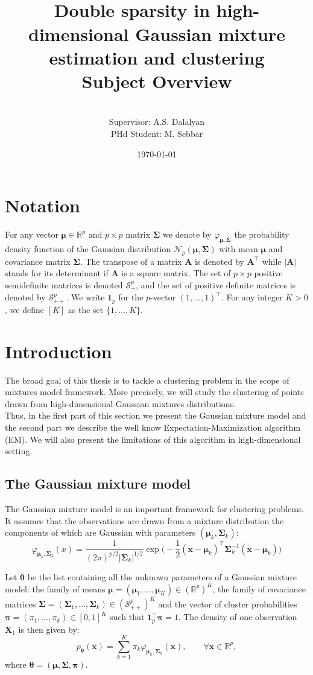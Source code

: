 \documentclass[a4paper,12pt]{article}
\title{\vspace{-60pt}~\\\textbf{\textsf{Double sparsity in high-dimensional Gaussian mixture estimation and clustering}}\\[20pt]
\textsf{Subject Overview}}
\author{\vspace{-20pt}~\\ \textsf{Supervisor: A.S. Dalalyan}\\
\textsf{PHd Student: M. Sebbar}}
\date{\today}
\let\bb\mathbb       %
\def\RR{{\bb R}}\def\ZZ{{\bb Z}}\def\FF{{\bb F}}\def\DD{{\bb D}}
\def\bb{\mathbb}
\def\bfA{\mathbf A}
\def\bSigma{\boldsymbol\Sigma}
\def\bmu{\boldsymbol\mu}
\def\btheta{{\boldsymbol\theta}}
\def\bX{\boldsymbol X\!}
\def\bx{\boldsymbol x}
\def\bpi{\boldsymbol \pi}
\def\b1{\mathbf 1}
\begin{document}
\maketitle
\tableofcontents
\newpage
\section{Notation}
For any vector $\bmu\in\RR^p$ and $p\times p$ matrix $\bSigma$ we denote by $\varphi_{\bmu,\bSigma}$ the probability density
function of the Gaussian distribution $\mathcal N_p(\bmu,\bSigma)$ with mean $\bmu$ and covariance matrix $\bSigma$.
The transpose of a matrix $\bfA $ is denoted by $\bfA ^\top$ while $|\bfA |$ stands for its determinant if $\bfA $ is a square matrix.
The set of $p\times p$ positive semidefinite matrices is denoted $\mathcal S_+^p$, and the set of positive definite
matrices is denoted by $\mathcal S_{++}^p$. We write $\b1_p$ for the $p$-vector $(1,\ldots,1)^\top$. For any integer $K>0$, we
define $[K]$ as the set $\{1,\ldots,K\}$.


\section{Introduction}
The broad goal of this thesis is to tackle a clustering problem in the scope of mixtures model framework. More precisely, we will study the clustering of points drawn from high-dimensional Gaussian mixtures distributions.\\Thus, in the first part of this section we present the Gaussian mixture model and the second part we describe the well know  Expectation-Maximization algorithm (EM). We will also present the limitations of this algorithm in high-dimensional setting.


\subsection{The Gaussian mixture model}

The Gaussian mixture model is an important framework for clustering problems. It assumes that the observations are drawn from a
mixture distribution the components of which are Gaussian  with parameters $(\bmu_k,\bSigma_k)$:
\begin{equation}
\varphi_{\bmu_k,\bSigma_k}(x)=\frac{1}{(2\pi)^{p/2}|\bSigma_k|^{1/2}} \exp\Big(-\frac{1}{2}(\bx-\bmu_k)^\top\bSigma_k^{-1}(\bx-\bmu_k)\Big)
\end{equation}

Let $\btheta$ be the list containing all the unknown parameters of a Gaussian mixture model: the family of means $\bmu = (\bmu_1,\ldots,\bmu_K)
\in (\RR^p)^K$, the family of covariance matrices $\bSigma = (\bSigma_1,\ldots,\bSigma_k)\in(\mathcal S_{++}^p)^K$ and the vector of cluster probabilities  $\bpi=(\pi_1,\ldots,\pi_k)\in [0,1]^K$ such that $\b1_p^\top\bpi=1$.
The density of one observation $\bX_1$ is then given by:
\begin{equation}\label{mixture}
p_{\btheta}(\bx)=\sum_{k=1}^K\pi_k\varphi_{\bmu_k,\bSigma_k}(\bx),\qquad \forall \bx\in\RR^p,
\end{equation}
where $\btheta=(\bmu,\bSigma,\bpi)$.
\end{document}
